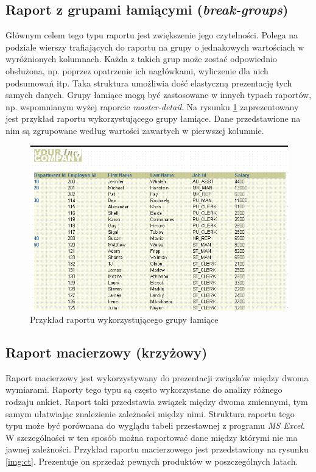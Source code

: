 \documentclass[11pt,a4paper]{article}
\begin{document}
\subsection{Raport z grupami łamiącymi (\emph{break-groups})} \label{teoria:bg}
Głównym celem tego typu raportu jest zwiększenie jego czytelności. Polega na podziale wierszy trafiających do raportu na grupy o jednakowych wartościach w wyróżnionych kolumnach. Każda z takich grup może zostać odpowiednio obsłużona, np. poprzez opatrzenie ich nagłówkami, wyliczenie dla nich podsumowań itp. Taka struktura umożliwia dość elastyczną prezentację tych samych danych. Grupy łamiące mogą być zastosowane w innych typach raportów, np. wspomnianym wyżej raporcie \emph{master-detail}. Na rysunku \ref{img:bg} zaprezentowany jest przykład raportu wykorzystującego grupy łamiące. Dane przedstawione na nim są zgrupowane według wartości zawartych w pierwszej kolumnie.
\begin{figure}[h]
\centering
\includegraphics[scale=0.7]{grp1col_lft1_out1}
\caption{Przykład raportu wykorzystującego grupy łamiące}
\label{img:bg}
\end{figure}

\subsection{Raport macierzowy (krzyżowy) } \label{teoria:ct}
Raport macierzowy jest wykorzystywany do prezentacji związków między dwoma wymiarami. Raporty tego typu są często wykorzystane do analizy różnego rodzaju ankiet. Raport taki przedstawia związek między dwoma zmiennymi, tym samym ułatwiając znalezienie zależności między nimi. Struktura raportu tego typu może być porównana do wyglądu tabeli przestawnej z programu \emph{MS Excel}. W szczególności w ten sposób można raportować dane między którymi nie ma jawnej zależności. Przykład raportu macierzowego jest przedstawiony na rysunku \ref{img:ct}. Prezentuje on sprzedaż pewnych produktów w poszczególnych latach. 
\end{document}
